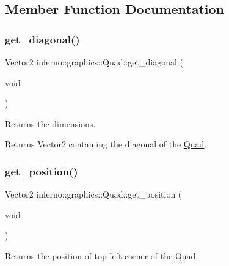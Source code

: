 \subsection{Member Function Documentation}
\mbox{\label{classinferno_1_1graphics_1_1_quad_ac74e1a04b7db17b490182fc130b010e5}} 
\subsubsection{\texorpdfstring{get\+\_\+diagonal()}{get\_diagonal()}}
{\footnotesize\ttfamily Vector2 inferno\+::graphics\+::\+Quad\+::get\+\_\+diagonal (\begin{DoxyParamCaption}\item[{void}]{ }\end{DoxyParamCaption})\hspace{0.3cm}{\ttfamily [inline]}}



Returns the dimensions. 

\begin{DoxyReturn}{Returns}
Vector2 containing the diagonal of the \mbox{\hyperlink{classinferno_1_1graphics_1_1_quad}{Quad}}. 
\end{DoxyReturn}
\mbox{\label{classinferno_1_1graphics_1_1_quad_a831d0c73cd040595dc44188d1941bcc6}} 
\subsubsection{\texorpdfstring{get\+\_\+position()}{get\_position()}}
{\footnotesize\ttfamily Vector2 inferno\+::graphics\+::\+Quad\+::get\+\_\+position (\begin{DoxyParamCaption}\item[{void}]{ }\end{DoxyParamCaption})\hspace{0.3cm}{\ttfamily [inline]}}



Returns the position of top left corner of the \mbox{\hyperlink{classinferno_1_1graphics_1_1_quad}{Quad}}. 

